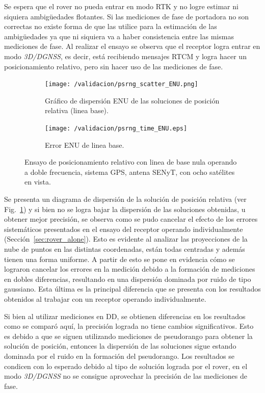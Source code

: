 \documentclass[a4paper,12pt,oneside,onecolumn,final,openright]{book}%
\begin{document}
	Se espera que el rover no pueda entrar en modo RTK y no logre estimar ni siquiera ambigüedades flotantes. Si las mediciones de fase de portadora no son correctas no existe forma de que las utilice para la estimación de las ambigüedades ya que ni siquiera va a haber consistencia entre las mismas mediciones de fase. Al realizar el ensayo se observa que el receptor logra entrar en modo \textit{3D/DGNSS}, es decir, está recibiendo mensajes RTCM y logra hacer un posicionamiento relativo, pero sin hacer uso de las mediciones de fase. 
\begin{figure}
\begin{subfigure}{1\linewidth}
\centering
  	\texttt{[image: /validacion/psrng\_scatter\_ENU.png]}
  	\caption{Gráfico de dispersión ENU de las soluciones de posición relativa (linea base).}
    \label{fig:scatter_psrng_DGNSS_Q}
\end{subfigure}


\begin{subfigure}{1\linewidth}
\centering
 	\texttt{[image: /validacion/psrng\_time\_ENU.eps]}
 	\caption{Error ENU de linea base.}
  	\label{fig:error_psrng_DGNSS_Q}

\end{subfigure}
\caption{Ensayo de posicionamiento relativo con linea de base nula operando a doble frecuencia, sistema GPS, antena SENyT, con ocho satélites en vista.}
\label{fig:ensayoDGNSS_psrng_Q}
\end{figure}

	Se presenta un diagrama de dispersión de la solución de posición relativa (ver Fig.~\ref{fig:scatter_psrng_DGNSS_Q}) y si bien no se logra bajar la dispersión de las soluciones obtenidas, u obtener mejor precisión, se observa como se pudo cancelar el efecto de los errores sistemáticos presentados en el ensayo del receptor operando individualmente (Sección~\ref{sec:rover_alone}). Esto es evidente al analizar las proyecciones de la nube de puntos en las distintas coordenadas, están todas centradas y además tienen una forma uniforme. A partir de esto se pone en evidencia cómo se lograron cancelar los errores en la medición debido a la formación de mediciones en dobles diferencias, resultando en una dispersión dominada por ruido de tipo gaussiano. Esta última es la principal diferencia que se presenta con los resultados obtenidos al trabajar con un receptor operando individualmente.
	
	Si bien al utilizar mediciones en DD, se obtienen diferencias en los resultados como se comparó aquí, la precisión lograda no tiene cambios significativos. Esto es debido a que se siguen utilizando mediciones de pseudorango para obtener la solución de posición, entonces la dispersión de las soluciones sigue estando dominada por el ruido en la formación del pseudorango. Los resultados se condicen con lo esperado debido al tipo de solución lograda por el rover, en el modo \textit{3D/DGNSS} no se consigue aprovechar la precisión de las mediciones de fase.
	
\end{document}
